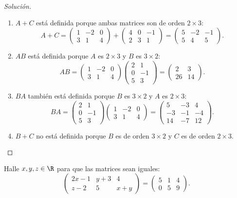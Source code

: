 \documentclass[a4,11pt]{aleph-notas}
\begin{document}
\begin{proof}[Soluci\'on]\hspace{0pt}
\begin{enumerate}
    \item $A+C$ est\'a definida porque ambas matrices son de orden $2\times 3$:
    \[
        A+C=
        \begin{pmatrix}1&-2&0\\3&1&4\end{pmatrix}+
        \begin{pmatrix}4&0&-1\\2&3&1\end{pmatrix}
        =\begin{pmatrix}5&-2&-1\\5&4&5\end{pmatrix}.
    \]
    \item $AB$ est\'a definida porque $A$ es $2\times 3$ y $B$ es $3\times 2$:
    \[
        AB=
        \begin{pmatrix}1&-2&0\\3&1&4\end{pmatrix}
        \begin{pmatrix}2&1\\0&-1\\5&3\end{pmatrix}
        =\begin{pmatrix}2&3\\26&14\end{pmatrix}.
    \]
    \item $BA$ tambi\'en est\'a definida porque $B$ es $3\times 2$ y $A$ es $2\times 3$:
    \[
        BA=
        \begin{pmatrix}2&1\\0&-1\\5&3\end{pmatrix}
        \begin{pmatrix}1&-2&0\\3&1&4\end{pmatrix}
        =\begin{pmatrix}5&-3&4\\-3&-1&-4\\14&-7&12\end{pmatrix}.
    \]
    \item $B+C$ no est\'a definida porque $B$ es de orden $3\times 2$ y $C$ es de orden $2\times 3$.
\end{enumerate}
\end{proof}

\begin{ejer}
    Halle $x,y,z\in\R$ para que las matrices sean iguales:
    \[
        \begin{pmatrix}
            2x-1 & y+3 & 4\\
            z-2 & 5 & x+y
        \end{pmatrix}
        =
        \begin{pmatrix}
            5 & 1 & 4\\
            0 & 5 & 9
        \end{pmatrix}.
    \]
\end{ejer}
\end{document}
